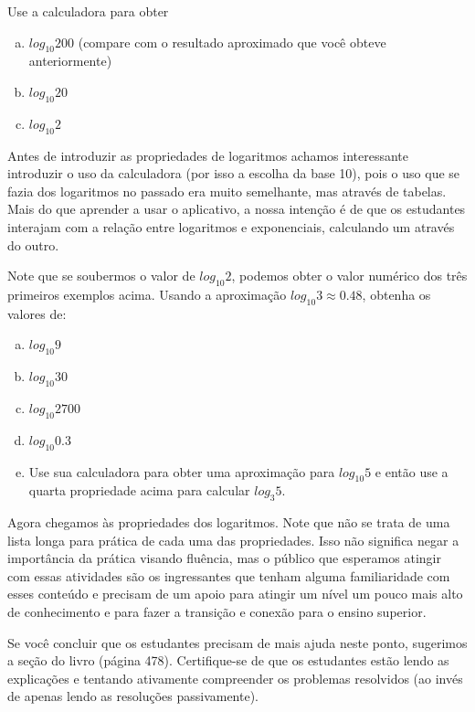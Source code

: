 \documentclass[main_estudante.tex]{subfiles}
\begin{document}
\begin{questao}
Use a calculadora para obter
\begin{enumerate}[a)]
\item $log_{10} 200$ (compare com o resultado aproximado que você obteve anteriormente)
\item $log_{10} 20$
\item $log_{10} 2$
\end{enumerate}
\end{questao}

Antes de introduzir as propriedades de logaritmos achamos interessante introduzir o uso da calculadora (por isso a escolha da base 10), pois o uso que se fazia dos logaritmos no passado era muito semelhante, mas através de tabelas. Mais do que aprender a usar o aplicativo, a nossa intenção é de que os estudantes interajam com a relação entre logaritmos e exponenciais, calculando um através do outro.

\begin{questao}
Note que se soubermos o valor de $log_{10} 2$, podemos obter o valor numérico dos três primeiros exemplos acima. Usando a aproximação $log_{10} 3 \approx 0.48$, obtenha os valores de:
\begin{enumerate}[a)]
\item $log_{10} 9$
\item $log_{10} 30$
\item $log_{10} 2700$
\item $log_{10} 0.3$
\item Use sua calculadora para obter uma aproximação para $log_{10} 5$ e então use a quarta propriedade acima para calcular $log_{3} 5$.
\end{enumerate}
\end{questao}

Agora chegamos às propriedades dos logaritmos. Note que não se trata de uma lista longa para prática de cada uma das propriedades. Isso não significa negar a importância da prática visando fluência, mas o público que esperamos atingir com essas atividades são os ingressantes que tenham alguma familiaridade com esses conteúdo e precisam de um apoio para atingir um nível um pouco mais alto de conhecimento e para fazer a transição e conexão para o ensino superior.

Se você concluir que os estudantes precisam de mais ajuda neste ponto, sugerimos a seção  do livro  (página 478). Certifique-se de que os estudantes estão lendo as explicações e tentando ativamente compreender os problemas resolvidos (ao invés de apenas lendo as resoluções passivamente).
\end{document}
